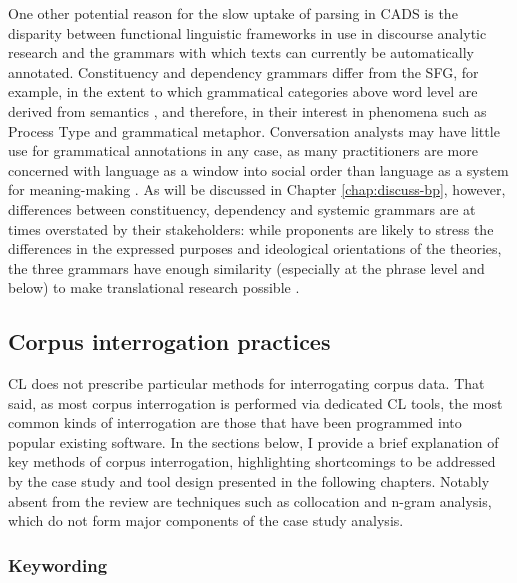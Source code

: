 One other potential reason for the slow uptake of parsing in \gls{CADS} is the disparity between functional linguistic frameworks in use in discourse analytic research and the grammars with which texts can currently be automatically annotated. Constituency and dependency grammars differ from the \gls{SFG}, for example, in the extent to which grammatical categories above word level are derived from semantics \cite{martin_english_1992}, and therefore, in their interest in phenomena such as Process Type and grammatical metaphor. Conversation analysts may have little use for grammatical annotations in any case, as many practitioners are more concerned with language as a window into social order than language as a system for meaning\hyp{}making \cite{ochs1996interaction}. As will be discussed in Chapter \ref{chap:discuss-bp}, however, differences between constituency, dependency and systemic grammars are at times overstated by their stakeholders: while proponents are likely to stress the differences in the expressed purposes and ideological orientations of the theories, the three grammars have enough similarity (especially at the phrase level and below) to make translational research possible \cite{costetchi_method_2013}.

\subsection{Corpus interrogation practices}

\gls{CL} does not prescribe particular methods for interrogating \gls{corpus} data. That said, as most corpus interrogation is performed via dedicated \gls{CL} tools, the most common kinds of interrogation are those that have been programmed into popular existing software. In the sections below, I provide a brief explanation of key methods of corpus interrogation, highlighting shortcomings to be addressed by the case study and tool design presented in the following chapters. Notably absent from the review are techniques such as collocation and n\hyp{}gram analysis, which do not form major components of the case study analysis.

\subsubsection{Keywording} \label{sect:keywording}

